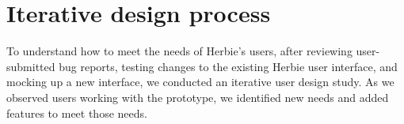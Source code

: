 \section{Iterative design process}

To understand how to meet the needs of Herbie's users,
  after reviewing user-submitted bug reports,
  testing changes to the existing Herbie user interface,
  and mocking up a new interface,
  we conducted an iterative user design study.
As we observed users working with the prototype,
  we identified new needs and added features
  to meet those needs.




  
